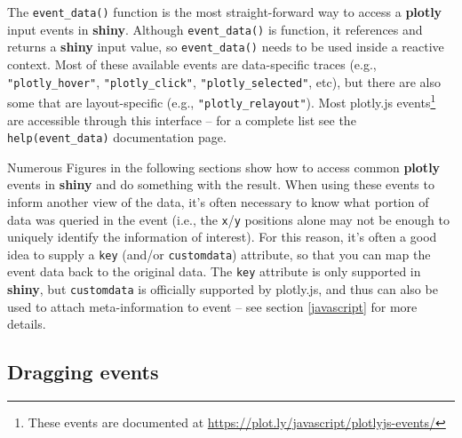\documentclass[
  12pt,
]{krantz}
\begin{document}
The \texttt{event\_data()} function is the most straight-forward way to access a \textbf{plotly} input events in \textbf{shiny}. Although \texttt{event\_data()} is function, it references and returns a \textbf{shiny} input value, so \texttt{event\_data()} needs to be used inside a reactive context. Most of these available events are data-specific traces (e.g., \texttt{"plotly\_hover"}, \texttt{"plotly\_click"}, \texttt{"plotly\_selected"}, etc), but there are also some that are layout-specific (e.g., \texttt{"plotly\_relayout"}). Most plotly.js events\footnote{These events are documented at \url{https://plot.ly/javascript/plotlyjs-events/}} are accessible through this interface -- for a complete list see the \texttt{help(event\_data)} documentation page.

Numerous Figures in the following sections show how to access common \textbf{plotly} events in \textbf{shiny} and do something with the result. When using these events to inform another view of the data, it's often necessary to know what portion of data was queried in the event (i.e., the \texttt{x}/\texttt{y} positions alone may not be enough to uniquely identify the information of interest). For this reason, it's often a good idea to supply a \texttt{key} (and/or \texttt{customdata}) attribute, so that you can map the event data back to the original data. The \texttt{key} attribute is only supported in \textbf{shiny}, but \texttt{customdata} is officially supported by plotly.js, and thus can also be used to attach meta-information to event -- see section \ref{javascript} for more details.

\hypertarget{dragging-events}{%
\subsection{Dragging events}\label{dragging-events}}
\end{document}
